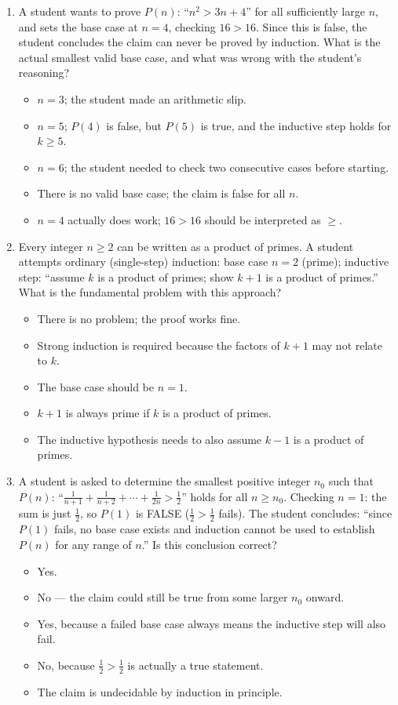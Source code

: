 \documentclass[11pt,a4paper]{article}
\begin{document}
\begin{enumerate}
\item A student wants to prove $P(n)$: ``$n^2>3n+4$'' for all sufficiently large $n$, and sets the base case at $n=4$, checking $16>16$. Since this is false, the student concludes the claim can never be proved by induction. What is the actual smallest valid base case, and what was wrong with the student's reasoning?
\begin{itemize}
\item[A)] $n=3$; the student made an arithmetic slip.
\item[B)] $n=5$; $P(4)$ is false, but $P(5)$ is true, and the inductive step holds for $k\geq5$.
\item[C)] $n=6$; the student needed to check two consecutive cases before starting.
\item[D)] There is no valid base case; the claim is false for all $n$.
\item[E)] $n=4$ actually does work; $16>16$ should be interpreted as $\geq$.
\end{itemize}

\item Every integer $n\geq2$ can be written as a product of primes. A student attempts ordinary (single-step) induction: base case $n=2$ (prime); inductive step: ``assume $k$ is a product of primes; show $k+1$ is a product of primes.'' What is the fundamental problem with this approach?
\begin{itemize}
\item[A)] There is no problem; the proof works fine.
\item[B)] Strong induction is required because the factors of $k+1$ may not relate to $k$.
\item[C)] The base case should be $n=1$.
\item[D)] $k+1$ is always prime if $k$ is a product of primes.
\item[E)] The inductive hypothesis needs to also assume $k-1$ is a product of primes.
\end{itemize}

\item A student is asked to determine the smallest positive integer $n_0$ such that $P(n)$: ``$\frac{1}{n+1}+\frac{1}{n+2}+\cdots+\frac{1}{2n}>\frac12$'' holds for all $n\geq n_0$. Checking $n=1$: the sum is just $\frac12$, so $P(1)$ is FALSE ($\frac12>\frac12$ fails). The student concludes: ``since $P(1)$ fails, no base case exists and induction cannot be used to establish $P(n)$ for any range of $n$.'' Is this conclusion correct?
\begin{itemize}
\item[A)] Yes.
\item[B)] No --- the claim could still be true from some larger $n_0$ onward.
\item[C)] Yes, because a failed base case always means the inductive step will also fail.
\item[D)] No, because $\frac12>\frac12$ is actually a true statement.
\item[E)] The claim is undecidable by induction in principle.
\end{itemize}


\end{enumerate}
\end{document}
